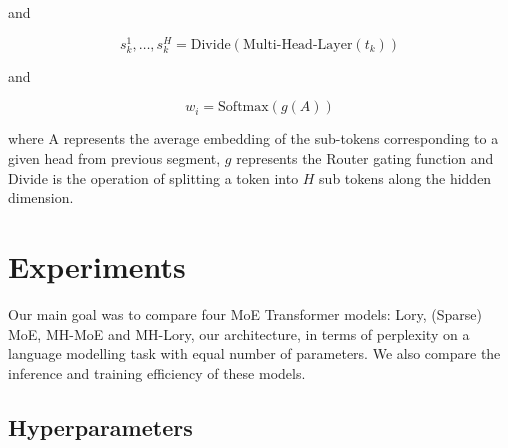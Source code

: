 \documentclass[12pt]{article}
\begin{document}
and

\[s_k^1,\dots, s_k^H = \text{Divide}(\text{Multi-Head-Layer}(t_k))\]

and

\[w_i = \text{Softmax}(g(A))\]

where A represents the average embedding of the sub-tokens corresponding to a given head from previous segment, $g$ represents the Router gating function and Divide is the operation of splitting a token into $H$ sub tokens along the hidden dimension.



\section{Experiments}
Our main goal was to compare four MoE Transformer models: Lory, (Sparse) MoE, MH-MoE and MH-Lory, our architecture, in terms of perplexity on a language modelling task with equal number of parameters. We also compare the inference and training efficiency of these models.

\subsection{Hyperparameters}
\end{document}
